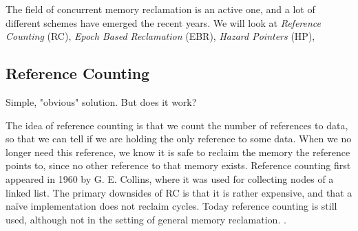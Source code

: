 \documentclass[a4paper,twoside]{article}
\begin{document}
The field of concurrent memory reclamation is an active one, and a lot of different schemes
have emerged the recent years. We will look at
\emph{Reference Counting} (RC),
\emph{Epoch Based Reclamation} (EBR),
\emph{Hazard Pointers} (HP),




\subsection{Reference Counting}
Simple, "obvious" solution. But does it work?

The idea of reference counting is that we count the number of references to data,
so that we can tell if we are holding the only reference to some data.
When we no longer need this reference, we know it is safe to reclaim the memory
the reference points to, since no other reference to that memory exists.
Reference counting first appeared in 1960 by G. E. Collins\cite{collins1960method},
where it was used for collecting nodes of a linked list.
The primary downsides of RC is that it is rather expensive, and that a na\"ive
implementation does not reclaim cycles.
Today reference counting is still used, although not in the setting of general
memory reclamation. 
.

%
\end{document}
